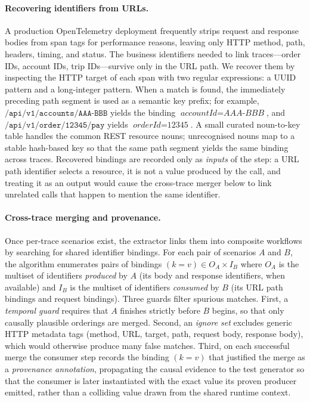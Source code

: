 \documentclass[conference]{IEEEtran}
\begin{document}
\paragraph{Recovering identifiers from URLs.}
A production OpenTelemetry deployment frequently strips request and response bodies from span tags for performance reasons, leaving only HTTP method, path, headers, timing, and status. The business identifiers needed to link traces---order IDs, account IDs, trip IDs---survive only in the URL path. We recover them by inspecting the HTTP target of each span with two regular expressions: a UUID pattern and a long-integer pattern. When a match is found, the immediately preceding path segment is used as a semantic key prefix; for example, $\texttt{/api/v1/accounts/AAA-BBB}$ yields the binding $\textit{accountId}{=}\textit{AAA-BBB}$, and $\texttt{/api/v1/order/12345/pay}$ yields $\textit{orderId}{=}\textit{12345}$. A small curated noun-to-key table handles the common REST resource nouns; unrecognised nouns map to a stable hash-based key so that the same path segment yields the same binding across traces. Recovered bindings are recorded only as \emph{inputs} of the step: a URL path identifier selects a resource, it is not a value produced by the call, and treating it as an output would cause the cross-trace merger below to link unrelated calls that happen to mention the same identifier.

\paragraph{Cross-trace merging and provenance.}
Once per-trace scenarios exist, the extractor links them into composite workflows by searching for shared identifier bindings. For each pair of scenarios $A$ and $B$, the algorithm enumerates pairs of bindings $(k{=}v) \in O_A \times I_B$ where $O_A$ is the multiset of identifiers \emph{produced} by $A$ (its body and response identifiers, when available) and $I_B$ is the multiset of identifiers \emph{consumed} by $B$ (its URL path bindings and request bindings). Three guards filter spurious matches. First, a \emph{temporal guard} requires that $A$ finishes strictly before $B$ begins, so that only causally plausible orderings are merged. Second, an \emph{ignore set} excludes generic HTTP metadata tags (method, URL, target, path, request body, response body), which would otherwise produce many false matches. Third, on each successful merge the consumer step records the binding $(k{=}v)$ that justified the merge as a \emph{provenance annotation}, propagating the causal evidence to the test generator so that the consumer is later instantiated with the exact value its proven producer emitted, rather than a colliding value drawn from the shared runtime context.
\end{document}
